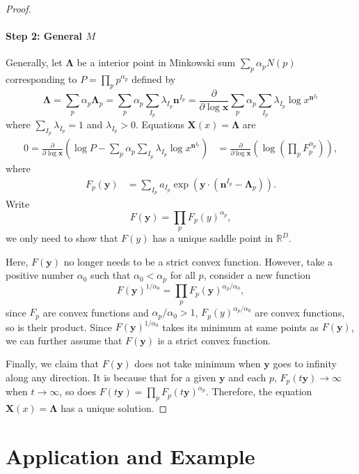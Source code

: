 \documentclass[12pt]{article}
\theoremstyle{definition}
\theoremstyle{plain}
\begin{document}
\begin{proof}
\paragraph{Step 2: General $M$}
Generally, let $\mathbf{\Lambda}$ be a interior point in Minkowski sum $\sum_p \alpha_p N(p)$ corresponding to $P=\prod_p p^{\alpha_p}$ defined by 
\[
	\mathbf{\Lambda}
	=\sum_p \alpha_p \mathbf{\Lambda}_p
	=\sum_p \alpha_p \sum_{I_p}\lambda_{I_p}\mathbf{n}^{I_p}
	=\frac{\partial}{\partial \log \mathbf{x}}\sum_{p}\alpha_p\sum_{I_p}\lambda_{I_p} \log x^{\mathbf n^{I_p}}
\]
where $\sum_{I_p} \lambda_{I_p}=1$ and $\lambda_{I_p} > 0$. Equations $\mathbf{X}(x)=\mathbf{\Lambda}$ are 
\[
\begin{aligned}
	0=\frac{\partial }{\partial \log \mathbf{x}}\left(
		\log P-\sum_{p}\alpha_p\sum_{I_p}\lambda_{I_p} \log x^{\mathbf n^{I_p}}
	\right)&=\frac{\partial }{\partial \log \mathbf{x}}\left(
	\log \left(\prod_p F_p^{\alpha_p}\right)
	\right),
\end{aligned}
\]
where
\[
	\begin{aligned}
		F_p(\mathbf y)&=\sum_{I_p} a_{I_p} \exp\left(\mathbf{y}\cdot \left(\mathbf{n}^{I_p}-\mathbf{\Lambda}_p\right)\right).
	\end{aligned}
\]
Write
\[
	F(\mathbf y)=\prod_p F_p(y)^{\alpha_p},
\]
we only need to show that $F(y)$ has a unique saddle point in $\mathbb R^D$.

Here, $F(\mathbf y)$ no longer needs to be
a strict convex function. However, take a positive number $\alpha_0$ such that 
$\alpha_0< \alpha_p$ for all $p$, consider a new function
\[
	F(\mathbf y)^{1/\alpha_0}=\prod_p F_p(\mathbf y)^{\alpha_p/\alpha_0},
\]
since $F_p$ are convex functions and $\alpha_p/\alpha_0>1$, $F_p(y)^{\alpha_p/\alpha_0}$ are convex functions,
so is their product. Since $F(\mathbf y)^{1/\alpha_0}$ takes its minimum at same points as $F(\mathbf y)$, 
we can further assume that $F(\mathbf y)$ is a strict convex function. 

Finally, we claim that $F(\mathbf y)$ does not take minimum when $\mathbf{y}$ goes to infinity 
along any direction. 
It is because that for a given $\mathbf{y}$ and each $p$, $F_p(t\mathbf{y})\to \infty$ when $t\to \infty$,
so does $F(t\mathbf{y})=\prod_p F_p(t\mathbf{y})^{\alpha_p}$. Therefore, the equation 
$\mathbf{X}(x)=\mathbf{\Lambda}$ has a unique solution.
\end{proof}



\section{Application and Example}
\end{document}
